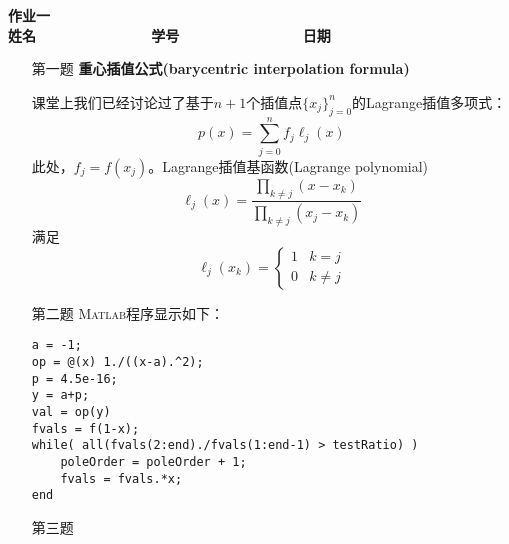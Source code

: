 \documentclass[12pt,a4paper,utf8]{ctexart}
\begin{document}


\begin{center}
\textbf{作业一}\\
\textbf{姓名 ~~~~~~~~~~~~~ 学号 ~~~~~~~~~~~~~~ 日期}\\
\end{center}

\begin{center}
\fbox{
\begin{minipage}{40em}
\vspace{5cm}
\hspace{20cm}
\end{minipage}}
\end{center}
\vspace{1cm}

\begin{enumerate}
\item[第一题] \textbf{重心插值公式(barycentric interpolation formula)}  

课堂上我们已经讨论过了基于$n+1$个插值点$\{x_j\}_{j=0}^n$的Lagrange插值多项式：
\begin{equation}
p(x) = \sum_{j=0}^{n} f_j \ell_j(x) \label{lagrange}
\end{equation}
此处，$f_j = f(x_j)$。Lagrange插值基函数(Lagrange polynomial)
\begin{equation}
\ell_{j}(x)=\frac{\prod_{k \neq j}\left(x-x_{k}\right)}{\prod_{k \neq j}\left(x_{j}-x_{k}\right)} \label{cardinal}
\end{equation}
满足
\begin{equation}
\ell_{j}\left(x_{k}\right)=\left\{\begin{array}{ll}
1 & k=j \\
0 & k \neq j
\end{array}\right. \nonumber
\end{equation}


\item[第二题]
\textsc{Matlab}程序显示如下：
\begin{lstlisting}[frame=single]
a = -1;
op = @(x) 1./((x-a).^2);
p = 4.5e-16;
y = a+p;
val = op(y)
fvals = f(1-x);
while( all(fvals(2:end)./fvals(1:end-1) > testRatio) )
    poleOrder = poleOrder + 1;
    fvals = fvals.*x;
end
\end{lstlisting}

\item[第三题]



\end{enumerate}
\end{document}
